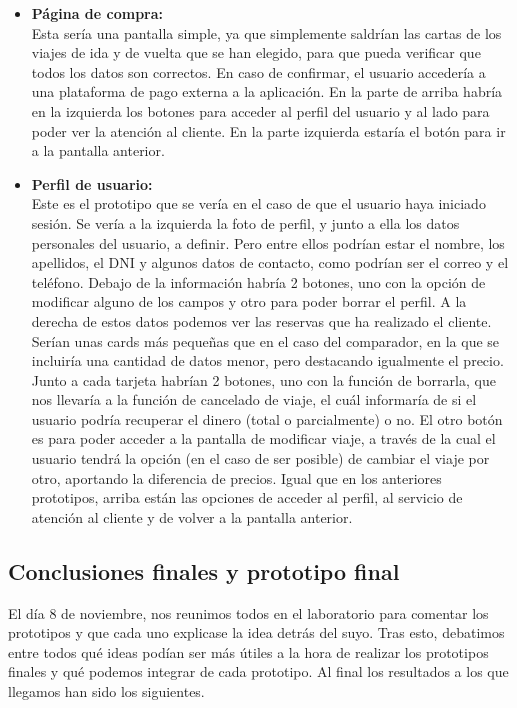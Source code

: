 \begin{itemize}
      \item\textbf{Página de compra:} \\ Esta sería una pantalla simple, ya que simplemente saldrían las cartas de los viajes de ida y de vuelta que se han elegido, para que pueda verificar que todos los datos son correctos. En caso de confirmar, el usuario accedería a una plataforma de pago externa a la aplicación. En la parte de arriba habría en la izquierda los botones para acceder al perfil del usuario y al lado para poder ver la atención al cliente. En la parte izquierda estaría el botón para ir a la pantalla anterior.
      \item\textbf{Perfil de usuario:} \\ Este es el prototipo que se vería en el caso de que el usuario haya iniciado sesión. Se vería a la izquierda la foto de perfil, y junto a ella los datos personales del usuario, a definir. Pero entre ellos podrían estar el nombre, los apellidos, el DNI y algunos datos de contacto, como podrían ser el correo y el teléfono. Debajo de la información habría 2 botones, uno con la opción de modificar alguno de los campos y otro para poder borrar el perfil. A la derecha de estos datos podemos ver las reservas que ha realizado el cliente. Serían unas cards más pequeñas que en el caso del comparador, en la que se incluiría una cantidad de datos menor, pero destacando igualmente el precio. Junto a cada tarjeta habrían 2 botones, uno con la función de borrarla, que nos llevaría a la función de cancelado de viaje, el cuál informaría de si el usuario podría recuperar el dinero (total o parcialmente) o no. El otro botón es para poder acceder a la pantalla de modificar viaje, a través de la cual el usuario tendrá la opción (en el caso de ser posible) de cambiar el viaje por otro, aportando la diferencia de precios. Igual que en los anteriores prototipos, arriba están las opciones de acceder al perfil, al servicio de atención al cliente y de volver a la pantalla anterior.

\end{itemize}

\subsection{Conclusiones finales y prototipo final}

El día 8 de noviembre, nos reunimos todos en el laboratorio para comentar los
prototipos y que cada uno explicase la idea detrás del suyo. Tras esto,
debatimos entre todos qué ideas podían ser más útiles a la hora de realizar los
prototipos finales y qué podemos integrar de cada prototipo. Al final los
resultados a los que llegamos han sido los siguientes.

